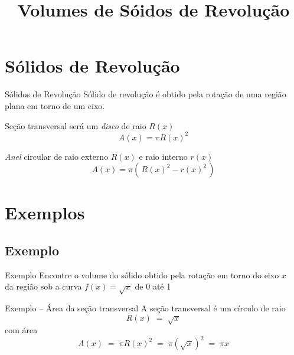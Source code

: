 \documentclass[fleqn,utf8,aspectratio=169,12pt]{beamer}
\title{Volumes de Sóidos de Revolução}
\begin{document}
\addtitle

\section{Sólidos de Revolução}

\begin{frame}{Sólidos de Revolução}
  Sólido de revolução é obtido pela rotação de uma
  região plana em torno de um eixo.

  \pause
  \vspace{\baselineskip}
  Seção transversal será um \emph{disco} de raio $R(x)$
  \[
    A(x) = \pi R(x)^2
  \]

  \pause
  \vspace{0.5\baselineskip}
  \emph{Anel} circular de raio externo $R(x)$ e raio interno $r(x)$
  \[
    A(x) = \pi \left(\, R(x)^2 - r(x)^2 \,\right)
  \]
\end{frame}


\section{Exemplos}

\addtocounter{exemplo}{1}
\subsection{Exemplo \theexemplo}

\begin{frame}{Exemplo \theexemplo}
  Encontre o volume do sólido obtido pela rotação em torno do eixo $x$ \\
  da região sob a curva \(f(x) = \sqrt{x}\) de 0 até 1
\end{frame}


\begin{frame}{Exemplo \theexemplo{} -- Área da seção transversal}
  A seção transversal é um círculo de raio
  \[
    R(x)
    \;=\; \sqrt{x}
  \]
  \pause
  com área
  \[
    A(x)
    \;=\; \pi R(x)^2
    \;=\; \pi \left(\sqrt{x}\right)^2
    \;=\; \pi x
  \]
\end{frame}
\end{document}
